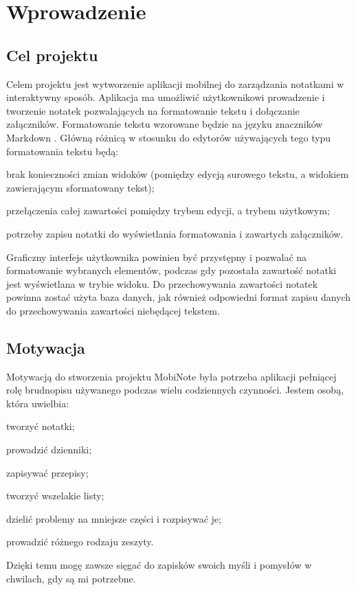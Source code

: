 \documentclass[shortabstract]{iithesis}
\author         {Bartosz Sobocki}
\begin{document}

\chapter{Wprowadzenie}

\section{Cel projektu}

Celem projektu jest wytworzenie aplikacji mobilnej do zarządzania notatkami w interaktywny sposób.
Aplikacja ma umożliwić użytkownikowi prowadzenie i tworzenie notatek pozwalających na formatowanie tekstu i dołączanie załączników.
Formatowanie tekstu wzorowane będzie na języku znaczników Markdown \cite{markdown}. Główną różnicą w stosunku do edytorów używających tego typu formatowania tekstu będą:
\begin{compactitem}
    \item brak konieczności zmian widoków (pomiędzy edycją surowego tekstu, a widokiem zawierającym sformatowany tekst);
    \item przełączenia całej zawartości pomiędzy trybem edycji, a trybem użytkowym;
    \item potrzeby zapisu notatki do wyświetlania formatowania i zawartych załączników.
\end{compactitem}

Graficzny interfejs użytkownika powinien być przystępny i pozwalać na formatowanie wybranych elementów, podczas gdy pozostała zawartość notatki jest wyświetlana w trybie widoku.
Do przechowywania zawartości notatek powinna zostać użyta baza danych, jak również odpowiedni format zapisu danych do przechowywania zawartości niebędącej tekstem.

\section{Motywacja}

Motywacją do stworzenia projektu MobiNote była potrzeba aplikacji pełniącej rolę brudnopisu używanego podczas wielu codziennych czynności. Jestem osobą, która uwielbia:

\begin{compactitem}
    \item tworzyć notatki;
    \item prowadzić dzienniki;
    \item zapisywać przepisy;
    \item tworzyć wszelakie listy;
    \item dzielić problemy na mniejsze części i rozpisywać je;
    \item  prowadzić różnego rodzaju zeszyty.
\end{compactitem}
Dzięki temu mogę zawsze sięgać do zapisków swoich myśli i pomysłów w chwilach, gdy są mi potrzebne.
\end{document}
